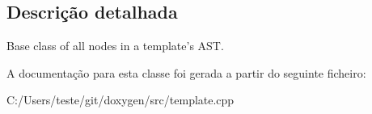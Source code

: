 \subsection{Descrição detalhada}
Base class of all nodes in a template's A\-S\-T. 

A documentação para esta classe foi gerada a partir do seguinte ficheiro\-:\begin{DoxyCompactItemize}
\item 
C\-:/\-Users/teste/git/doxygen/src/template.\-cpp\end{DoxyCompactItemize}
